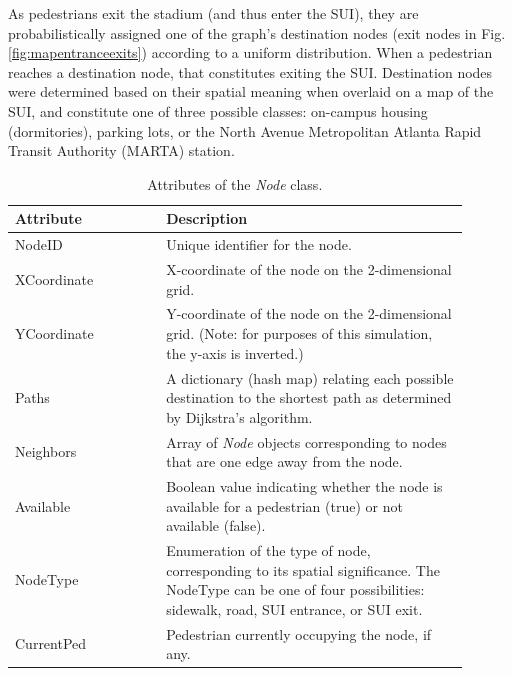 \documentclass[12pt]{article}
\begin{document}
As pedestrians exit the stadium (and thus enter the SUI), they are
probabilistically assigned one of the graph's destination nodes (exit nodes
in Fig. \ref{fig:mapentranceexits}) according to a uniform distribution. When
a pedestrian reaches a destination node, that constitutes exiting the SUI.
Destination nodes were determined based on their spatial meaning when overlaid
on a map of the SUI, and constitute one of three possible classes: on-campus
housing (dormitories), parking lots, or the North Avenue Metropolitan Atlanta
Rapid Transit Authority (MARTA) station.

\def\arraystretch{1.5}
\begin{table}[hb!]
  \centering
    \begin{tabular}{p{0.3\linewidth}p{0.6\linewidth}}
     \hline
     Attribute & Description \\
     \hline
     NodeID      & Unique identifier for the node. \\
     XCoordinate & X-coordinate of the node on the 2-dimensional grid. \\
     YCoordinate & Y-coordinate of the node on the 2-dimensional grid.
                   (Note: for purposes of this simulation, the y-axis is
                    inverted.) \\
     Paths       & A dictionary (hash map) relating each possible destination
                   to the shortest path as determined by Dijkstra's algorithm.\\
     Neighbors & Array of \textit{Node} objects corresponding to nodes that are
                 one edge away from the node. \\
     Available	& Boolean value indicating whether the node is available for a
                  pedestrian (true) or not available (false). \\
     NodeType   & Enumeration of the type of node, corresponding to its
                  spatial significance. The NodeType can be one of four
                  possibilities: sidewalk, road, SUI entrance, or SUI exit. \\
     CurrentPed & Pedestrian currently occupying the node, if any. \\
     \hline
    \end{tabular}
    \caption{Attributes of the \textit{Node} class.}
  \label{table:node}
\end{table}
\end{document}
